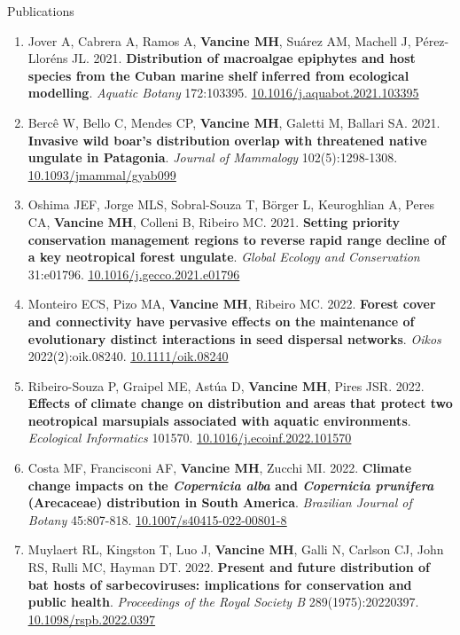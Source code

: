 \documentclass{resume}
\begin{document}
\begin{rSection}{Publications}
\begin{enumerate}
\item Jover A, Cabrera A, Ramos A, {\bf Vancine MH}, Suárez AM, Machell J, Pérez-Lloréns JL. 2021. {\bf Distribution of macroalgae epiphytes and host species from the Cuban marine shelf inferred from ecological modelling}. {\it Aquatic Botany} 172:103395. \href{https://doi.org/10.1016/j.aquabot.2021.103395}{\underline{10.1016/j.aquabot.2021.103395}}

\item Bercê W, Bello C, Mendes CP, {\bf Vancine MH}, Galetti M, Ballari SA. 2021. {\bf Invasive wild boar’s distribution overlap with threatened native ungulate in Patagonia}. {\it Journal of Mammalogy} 102(5):1298-1308. \href{https://doi.org/10.1093/jmammal/gyab099}{\underline{10.1093/jmammal/gyab099}}

\item Oshima JEF, Jorge MLS, Sobral-Souza T, Börger L, Keuroghlian A, Peres CA, {\bf Vancine MH}, Colleni B, Ribeiro MC. 2021. {\bf Setting priority conservation management regions to reverse rapid range decline of a key neotropical forest ungulate}. {\it Global Ecology and Conservation} 31:e01796. \href{https://doi.org/10.1016/j.gecco.2021.e01796}{\underline{10.1016/j.gecco.2021.e01796}}

\item Monteiro ECS, Pizo MA, {\bf Vancine MH}, Ribeiro MC. 2022. {\bf Forest cover and connectivity have pervasive effects on the maintenance of evolutionary distinct interactions in seed dispersal networks}. {\it Oikos} 2022(2):oik.08240. \href{https://doi.org/10.1111/oik.08240}{\underline{10.1111/oik.08240}}

\item Ribeiro-Souza P, Graipel ME, Astúa D, {\bf Vancine MH}, Pires JSR. 2022. {\bf Effects of climate change on distribution and areas that protect two neotropical marsupials associated with aquatic environments}. {\it Ecological Informatics} 101570. \href{https://doi.org/10.1016/j.ecoinf.2022.101570}{\underline{10.1016/j.ecoinf.2022.101570}}

\item Costa MF, Francisconi AF, {\bf Vancine MH}, Zucchi MI. 2022. {\bf Climate change impacts on the \textbf{\textit{ Copernicia alba}} and \textbf{\textit{Copernicia prunifera}} (Arecaceae) distribution in South America}. {\it Brazilian Journal of Botany} 45:807-818. \href{https://doi.org/10.1007/s40415-022-00801-8}{\underline{10.1007/s40415-022-00801-8}}

\item Muylaert RL, Kingston T, Luo J, {\bf Vancine MH}, Galli N, Carlson CJ, John RS, Rulli MC, Hayman DT. 2022. {\bf Present and future distribution of bat hosts of sarbecoviruses: implications for conservation and public health}. {\it Proceedings of the Royal Society B} 289(1975):20220397. \href{https://doi.org/10.1098/rspb.2022.0397}{\underline{10.1098/rspb.2022.0397}}


\end{enumerate}
\end{rSection}
\end{document}
